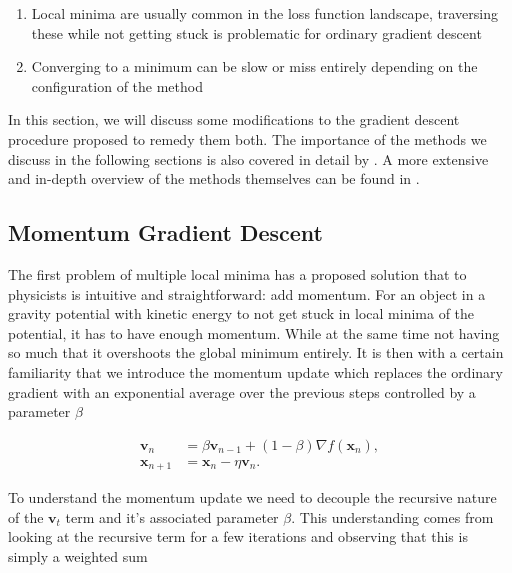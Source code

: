 \begin{enumerate}[start=0, label={(\bfseries C\arabic*):}]
\item Local minima are usually common in the loss function landscape, traversing these while not getting stuck is problematic for ordinary gradient descent
\item Converging to a minimum  can be slow or miss entirely depending on the configuration of the method 
\end{enumerate}

\noindent In this section, we will discuss some modifications to the gradient descent procedure proposed to remedy them both.  The importance of the methods we discuss in the following sections is also covered in detail by \citet{Sutskever2013}. A more extensive and in-depth overview of the methods themselves can be found in \citet{Ruder}.

\subsection{Momentum Gradient Descent}\label{sec:momentum_gd}

The first problem of multiple local minima has a proposed solution that to physicists is intuitive and straightforward: add momentum. For an object in a gravity potential with kinetic energy to not get stuck in local minima of the potential, it has to have enough momentum. While at the same time not having so much that it overshoots the global minimum entirely. It is then with a certain familiarity that we introduce the momentum update which replaces the ordinary gradient with an exponential average over the previous steps controlled by a parameter $\beta$

\begin{equation}\label{eq:momentum}
\begin{split}
\boldsymbol{v}_n &= \beta \boldsymbol{v}_{n-1} + (1 - \beta) \nabla f(\boldsymbol{x}_{n}),\\
\boldsymbol{x}_{n+1} &= \boldsymbol{x}_n - \eta\boldsymbol{v}_n .
\end{split}
\end{equation}


\noindent To understand the momentum update we need to decouple the recursive nature of the $\boldsymbol{v}_t$ term and it's associated parameter $\beta$. This understanding comes from looking at the recursive term for a few iterations and observing that this is simply a weighted sum 

